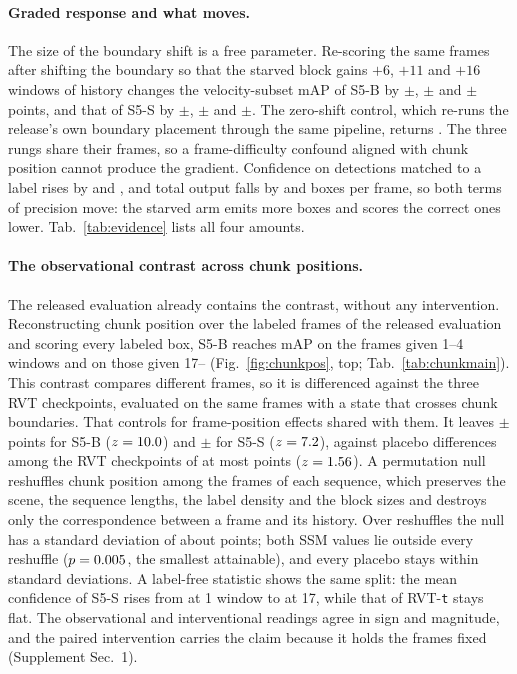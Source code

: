 \documentclass[10pt,twocolumn,letterpaper]{article}
\begin{document}
\paragraph{Graded response and what moves.}
The size of the boundary shift is a free parameter. Re-scoring the same \ssmDoseN{} frames after
shifting the boundary so that the starved block gains $+6$, $+11$ and $+16$ windows of history
changes the velocity-subset mAP of S5-B by \ssmDoseBaseSix$\pm$\ssmDoseBaseSixSE{},
\ssmDoseBaseEleven$\pm$\ssmDoseBaseElevenSE{} and
\ssmPairedMapVelBase$\pm$\ssmPairedMapVelBaseSE{} points, and that of S5-S by
\ssmDoseSmallSix$\pm$\ssmDoseSmallSixSE{}, \ssmDoseSmallEleven$\pm$\ssmDoseSmallElevenSE{} and
\ssmPairedMapVelSmall$\pm$\ssmPairedMapVelSmallSE{}. The zero-shift control, which re-runs the
release's own boundary placement through the same pipeline, returns \ssmDoseNull{}. The three rungs share their frames, so a frame-difficulty confound aligned with chunk position cannot produce the gradient. Confidence on detections matched to a
label rises by \ssmPairedConfTpBase{} and \ssmPairedConfTpSmall{}, and total output falls by
\ssmPairedDpfBase{} and \ssmPairedDpfSmall{} boxes per frame, so both terms of precision move: the starved arm emits more boxes and scores the correct ones lower.
Tab.~\ref{tab:evidence} lists all four amounts.

\paragraph{The observational contrast across chunk positions.}
The released evaluation already contains the contrast, without any intervention. Reconstructing chunk position over the \mapFrames{} labeled frames of the released evaluation and
scoring every labeled box, S5-B reaches \chunkShortBase{} mAP on the frames given 1--4
windows and \chunkFullBase{} on those given 17--\ssmEvalChunk{}
(Fig.~\ref{fig:chunkpos}, top; Tab.~\ref{tab:chunkmain}). This contrast compares different frames, so it is differenced
against the three RVT checkpoints, evaluated on the same frames with a state that crosses chunk
boundaries. That controls for frame-position effects shared with them. It leaves
\chunkDidBase$\pm$\chunkDidBaseSE{} points for S5-B ($z=10.0$) and
\chunkDidSmall$\pm$\chunkDidSmallSE{} for S5-S ($z=7.2$), against placebo
differences among the RVT checkpoints of at most \chunkPlaceboMax{} points
($z=1.56$). A permutation null reshuffles chunk position among the frames of each sequence, which preserves the scene, the sequence lengths, the label density and the block sizes and destroys only the correspondence between a frame and its history. Over \chunkPermB{} reshuffles the null has a standard deviation of about \chunkPermSd{} points; both SSM values lie outside every reshuffle ($p=0.005$, the smallest attainable), and every placebo stays within \chunkPermPlaceboZ{} standard deviations. A label-free statistic shows the same split: the mean confidence of S5-S rises from \chunkConfOne{} at 1 window to \chunkConfFull{} at 17, while that of RVT-\texttt{t} stays flat. The observational and interventional readings agree in sign and magnitude, and the paired intervention carries the claim
because it holds the frames fixed (Supplement Sec.~1).
\end{document}

